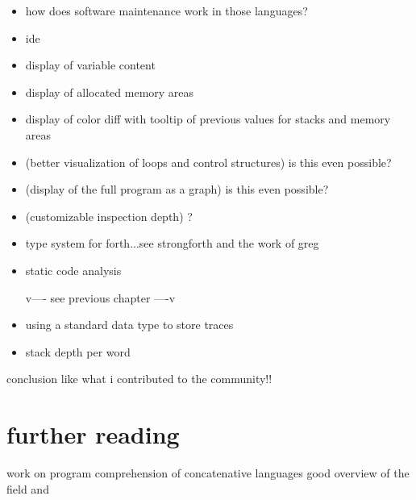 \begin{itemize}
\item how does software maintenance work in those languages?
\item ide
\item display of variable content
\item display of allocated memory areas
\item display of color diff with tooltip of previous values for stacks and memory areas
\item (better visualization of loops and control structures) is this even possible?
\item (display of the full program as a graph) is this even possible?
\item (customizable inspection depth) ?
\item type system for forth...see strongforth and the work of greg

\item static code analysis

v---- see previous chapter ----v
\item using a standard data type to store traces
\item stack depth per word
\end{itemize}

conclusion like what i contributed to the community!!\\

\section{further reading}

work on program comprehension of concatenative languages
good overview of the field \cite{Canfora:2011:ACS:1924421.1924451} and \cite{Cornelissen2009}